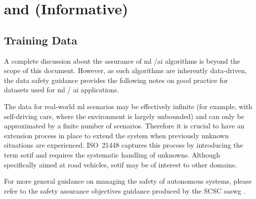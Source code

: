%
%
\chapter{ and  (Informative)} \label{bkm:MachineLearning}



\section{ Training Data}
A complete discussion about the assurance of \gls{ml} /\gls{ai} algorithms is beyond the scope of this document.
However, as such algorithms are inherently data-driven, the data safety guidance provides the following notes on good practice for \glspl{dataset} used for \gls{ml} / \gls{ai} applications.

The data for real-world \gls{ml} scenarios may be effectively infinite (for example, with self-driving cars, where the environment is largely unbounded) and can only be approximated by a finite number of scenarios.
Therefore it is crucial to have an extension process in place to extend the system when previously unknown situations are experienced. 
ISO~21448 \cite{citation:ISO21448} captures this process by introducing the term \gls{sotif} and requires the systematic handling of unknowns. Although specifically aimed at road vehicles, \gls{sotif} may be of interest to other domains.

For more general guidance on managing the safety of autonomous systems, please refer to the safety assurance objectives guidance produced by the SCSC \gls{saswg} \cite{citation:SASWG:Objectives}.

